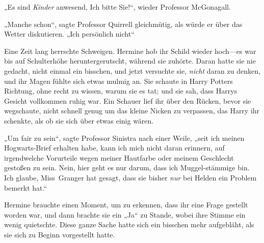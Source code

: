 „Es sind \emph{Kinder} anwesend, Ich bitte Sie!“, wieder Professor McGonagall.

„Manche schon“, sagte Professor Quirrell gleichmütig, als würde er über das Wetter diskutieren. „Ich persönlich nicht“

Eine Zeit lang herrschte Schweigen. Hermine hob ihr Schild wieder hoch—es war bis auf Schulterhöhe heruntergerutscht, während sie zuhörte. Daran hatte sie nie gedacht, nicht einmal ein bisschen, und jetzt versuchte sie, \emph{nicht} daran zu denken, und ihr Magen fühlte sich etwas mulmig an. Sie schaute in Harry Potters Richtung, ohne recht zu wissen, warum sie es tat; und sie sah, dass Harrys Gesicht vollkommen ruhig war. Ein Schauer lief ihr über den Rücken, bevor sie wegschaute, nicht schnell genug um das kleine Nicken zu verpassen, das Harry ihr schenkte, als ob sie sich über etwas einig wären.

„Um fair zu sein“, sagte Professor Sinistra nach einer Weile, „seit ich meinen Hogwarts-Brief erhalten habe, kann ich mich nicht daran erinnern, auf irgendwelche Vorurteile wegen meiner Hautfarbe oder meinem Geschlecht gestoßen zu sein. Nein, hier geht es nur darum, dass ich Muggel-stämmige bin. Ich glaube, Miss~Granger hat gesagt, dass sie bisher \emph{nur} bei Helden ein Problem bemerkt hat.“

Hermine brauchte einen Moment, um zu erkennen, dass ihr eine Frage gestellt worden war, und dann brachte sie ein „Ja“ zu Stande, wobei ihre Stimme ein wenig quietschte. Diese ganze Sache hatte sich ein bisschen mehr aufgebläht, als sie sich zu Beginn vorgestellt hatte.

